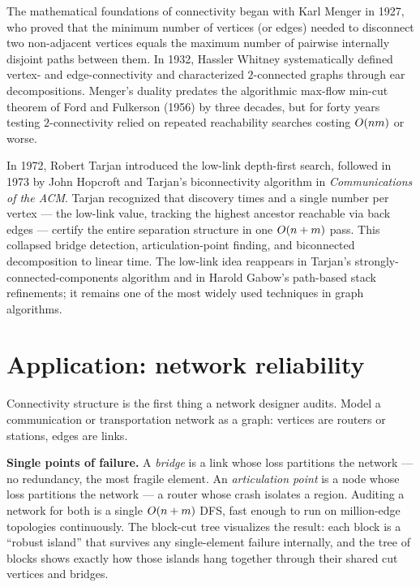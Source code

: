 \begin{historybox}
The mathematical foundations of connectivity began with Karl Menger in 1927, who proved that
the minimum number of vertices (or edges) needed to disconnect two non-adjacent vertices equals
the maximum number of pairwise internally disjoint paths between them. In 1932, Hassler Whitney
systematically defined vertex- and edge-connectivity and characterized $2$-connected graphs through
ear decompositions. Menger's duality predates the algorithmic max-flow min-cut theorem of Ford
and Fulkerson (1956) by three decades, but for forty years testing $2$-connectivity relied on
repeated reachability searches costing $O(nm)$ or worse.

In 1972, Robert Tarjan introduced the low-link depth-first search, followed in 1973 by John Hopcroft
and Tarjan's biconnectivity algorithm in \emph{Communications of the ACM}. Tarjan recognized that
discovery times and a single number per vertex --- the low-link value, tracking the highest ancestor
reachable via back edges --- certify the entire separation structure in one $O(n+m)$ pass.
This collapsed bridge detection, articulation-point finding, and biconnected decomposition to linear
time. The low-link idea reappears in Tarjan's strongly-connected-components algorithm and in Harold
Gabow's path-based stack refinements; it remains one of the most widely used techniques in graph algorithms.
\end{historybox}

\section{Application: network reliability}
\label{ch10:reliability}

Connectivity structure is the first thing a network designer audits. Model a
communication or transportation network as a graph: vertices are routers or stations,
edges are links.

\begin{applicationbox}
\textbf{Single points of failure.} A \emph{bridge} is a link whose loss partitions the
network --- no redundancy, the most fragile element. An \emph{articulation point} is a
node whose loss partitions the network --- a router whose crash isolates a region.
Auditing a network for both is a single $O(n+m)$ DFS, fast enough to run on
million-edge topologies continuously. The block-cut tree visualizes the result: each
block is a ``robust island'' that survives any single-element failure internally, and
the tree of blocks shows exactly how those islands hang together through their shared
cut vertices and bridges.
\end{applicationbox}


